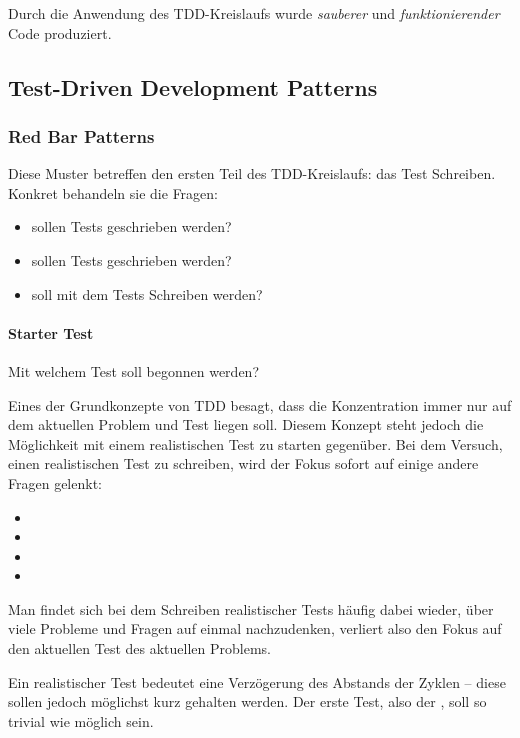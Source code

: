 Durch die Anwendung des TDD-Kreislaufs wurde \textit{sauberer} und \textit{funktionierender} Code produziert.

\subsection{Test-Driven Development Patterns}
\subsubsection{Red Bar Patterns}

Diese Muster betreffen den ersten Teil des TDD-Kreislaufs: das Test Schreiben.
Konkret behandeln sie die Fragen:
\begin{itemize}
  \item {} sollen Tests geschrieben werden?
  \item {} sollen Tests geschrieben werden?
  \item {} soll mit dem Tests Schreiben  werden?
\end{itemize}

\paragraph{Starter Test}
Mit welchem Test soll begonnen werden?

Eines der Grundkonzepte von TDD besagt, dass die Konzentration immer nur auf dem aktuellen Problem und Test liegen soll. Diesem Konzept steht jedoch die Möglichkeit mit einem realistischen Test zu starten gegenüber. Bei dem Versuch, einen realistischen Test zu schreiben, wird der Fokus sofort auf einige andere Fragen gelenkt: 
\begin{itemize}
  \item {}
  \item {}
  \item {}
  \item {}
\end{itemize}
Man findet sich bei dem Schreiben realistischer Tests häufig dabei wieder, über viele Probleme und Fragen auf einmal nachzudenken, verliert also den Fokus auf den aktuellen Test des aktuellen Problems.

Ein realistischer Test bedeutet eine Verzögerung des Abstands der  Zyklen -- diese sollen jedoch möglichst kurz gehalten werden. Der erste Test, also der , soll so trivial wie möglich sein.


